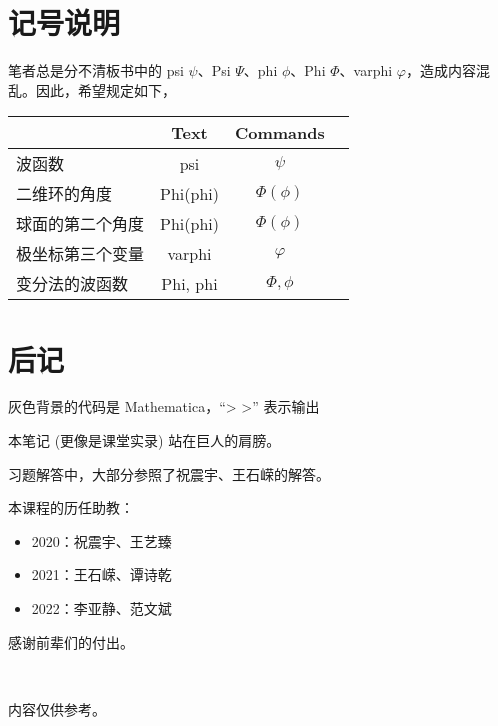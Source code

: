 \section{记号说明}
笔者总是分不清板书中的 psi $\psi$、Psi $\Psi$、phi $\phi$、Phi $\Phi$、varphi $\varphi$，造成内容混乱。因此，希望规定如下，
\begin{table}[ht]
    \centering
    \begin{tabular}[t]{lccc}
    \toprule
    &Text&Commands\\
    \midrule
    波函数 & psi & $\psi$ \\
    二维环的角度 & Phi(phi) & $\Phi(\phi)$ \\
    球面的第二个角度 & Phi(phi) & $\Phi(\phi) $ \\
    极坐标第三个变量 & varphi & $\varphi$ \\
    变分法的波函数 & Phi, phi & $\Phi, \phi$ \\
    \bottomrule
    \end{tabular}
\end{table}%

\section{后记}

灰色背景的代码是 Mathematica，``> >'' 表示输出

本笔记 (更像是课堂实录) 站在巨人的肩膀。

习题解答中，大部分参照了祝震宇、王石嵘的解答。

本课程的历任助教：
\begin{itemize}
    \item 2020：祝震宇、王艺臻
    \item 2021：王石嵘、谭诗乾
    \item 2022：李亚静、范文斌
\end{itemize}

感谢前辈们的付出。

~

内容仅供参考。
